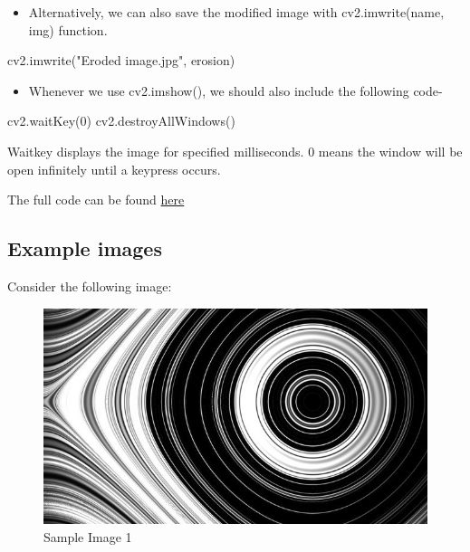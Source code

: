 \documentclass[]{article}
\newenvironment{Shaded}{}{}
\newcommand{\DecValTok}[1]{\textcolor[rgb]{0.25,0.63,0.44}{{#1}}}
\newcommand{\StringTok}[1]{\textcolor[rgb]{0.25,0.44,0.63}{{#1}}}
\newcommand{\NormalTok}[1]{{#1}}
\providecommand{\tightlist}{%
  \setlength{\itemsep}{0pt}\setlength{\parskip}{0pt}}
\begin{document}
\begin{itemize}
\tightlist
\item
  Alternatively, we can also save the modified image with
  cv2.imwrite(name, img) function.
\end{itemize}

\begin{Shaded}
\begin{Highlighting}[]
    \NormalTok{cv2.imwrite(}\StringTok{"Eroded image.jpg"}\NormalTok{, erosion)}
\end{Highlighting}
\end{Shaded}

\begin{itemize}
\tightlist
\item
  Whenever we use cv2.imshow(), we should also include the following
  code-
\end{itemize}

\begin{Shaded}
\begin{Highlighting}[]
    \NormalTok{cv2.waitKey(}\DecValTok{0}\NormalTok{)}
    \NormalTok{cv2.destroyAllWindows()}
    
\end{Highlighting}
\end{Shaded}

Waitkey displays the image for specified milliseconds. 0 means the
window will be open infinitely until a keypress occurs.

The full code can be found
\href{https://github.com/eyantrainternship/eYSIP_2015_Marker_based_Robot_Localisation/tree/master/Task-2/Morphological\%20operations/src}{here}

\subsection{Example images}\label{example-images}

Consider the following image:

\begin{figure}[htbp]
\centering
\includegraphics{images/Morphological Operations/Images/music.jpg}
\caption{Sample Image 1}
\end{figure}
\end{document}
